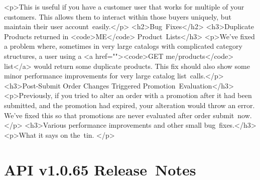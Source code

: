 \documentclass{memoir}%
\begin{document}
<p>This is useful if you have a customer user that works for multiple of your customers. This allows them to interact within those buyers uniquely, but maintain their user account~easily.</p>\newline%
<h2>Bug~Fixes</h2>\newline%
<h3>Duplicate Products returned in <code>ME</code> Product~Lists</h3>\newline%
<p>We’ve fixed a problem where, sometimes in very large catalogs with complicated category structures, a user using a <a href=""><code>GET me/products</code> list</a> would return some duplicate products. This fix should also show some minor performance improvements for very large catalog list~calls.</p>\newline%
<h3>Post{-}Submit Order Changes Triggered Promotion~Evaluation</h3>\newline%
<p>Previously, if you tried to alter an order with a promotion after it had been submitted, and the promotion had expired, your alteration would throw an error. We’ve fixed this so that promotions are never evaluated after order submit~now.</p>\newline%
<h3>Various performance improvements and other small bug~fixes.</h3>\newline%
<p>What it says on the~tin. </p>

%
\section*{API v1.0.65 Release~Notes}%
\paragraph*{}%

%
\end{document}
